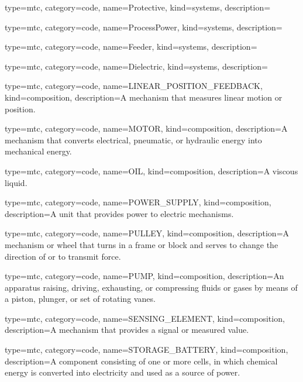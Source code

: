 {
  type=mtc,
  category=code,
  name={Protective},
  kind={systems},
  description={}
}


{
  type=mtc,
  category=code,
  name={ProcessPower},
  kind={systems},
  description={}
}


{
  type=mtc,
  category=code,
  name={Feeder},
  kind={systems},
  description={}
}


{
  type=mtc,
  category=code,
  name={Dielectric},
  kind={systems},
  description={}
}


{
  type=mtc,
  category=code,
  name={LINEAR\_POSITION\_FEEDBACK},
  kind={composition},
  description={A mechanism that measures linear motion or position.}
}


{
  type=mtc,
  category=code,
  name={MOTOR},
  kind={composition},
  description={A mechanism that converts electrical, pneumatic, or hydraulic energy into mechanical energy.}
}


{
  type=mtc,
  category=code,
  name={OIL},
  kind={composition},
  description={A viscous liquid.}
}


{
  type=mtc,
  category=code,
  name={POWER\_SUPPLY},
  kind={composition},
  description={A unit that provides power to electric mechanisms.}
}


{
  type=mtc,
  category=code,
  name={PULLEY},
  kind={composition},
  description={A mechanism or wheel that turns in a frame or block and serves to change the direction of or to transmit force.}
}


{
  type=mtc,
  category=code,
  name={PUMP},
  kind={composition},
  description={An apparatus raising, driving, exhausting, or compressing fluids or gases by means of a piston, plunger, or set of rotating vanes.}
}


{
  type=mtc,
  category=code,
  name={SENSING\_ELEMENT},
  kind={composition},
  description={A mechanism that provides a signal or measured value.}
}


{
  type=mtc,
  category=code,
  name={STORAGE\_BATTERY},
  kind={composition},
  description={A component consisting of one or more cells, in which chemical energy is converted into electricity and used as a source of power. }
}


